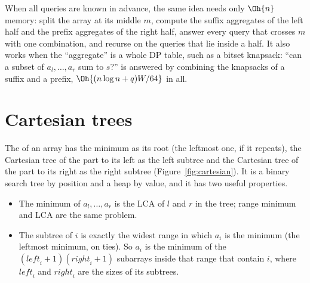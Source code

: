 
\begin{trick}
When all queries are known in advance, the same idea needs only $\Oh{n}$ memory: split the array at its middle $m$, compute the
suffix aggregates of the left half and the prefix aggregates of the right half, answer every query that crosses $m$ with one
combination, and recurse on the queries that lie inside a half. It also works when the ``aggregate'' is a whole DP table, such as a
bitset knapsack: ``can a subset of $a_l, \dots, a_r$ sum to $s$?'' is answered by combining the knapsacks of a suffix and a prefix,
$\Oh{(n \log n + q) W / 64}$ in all.
\end{trick}

\section[Cartesian trees]{Cartesian trees \hfill \plat}\label{sec:cartesian}

The  of an array has the minimum as its root (the leftmost one, if it repeats), the Cartesian tree of the part
to its left as the left subtree and the Cartesian tree of the part to its right as the right subtree (Figure~\ref{fig:cartesian}).
It is a binary search tree by position and a heap by value, and it has two useful properties.
\begin{itemize}
  \item The minimum of $a_l, \dots, a_r$ is the LCA of $l$ and $r$ in the tree; range minimum and LCA are the same problem.
  \item The subtree of $i$ is exactly the widest range in which $a_i$ is the minimum (the leftmost minimum, on ties). So $a_i$ is the
        minimum of the $(\mathit{left}_i + 1)(\mathit{right}_i + 1)$ subarrays inside that range that contain $i$, where
        $\mathit{left}_i$ and $\mathit{right}_i$ are the sizes of its subtrees.
\end{itemize}

